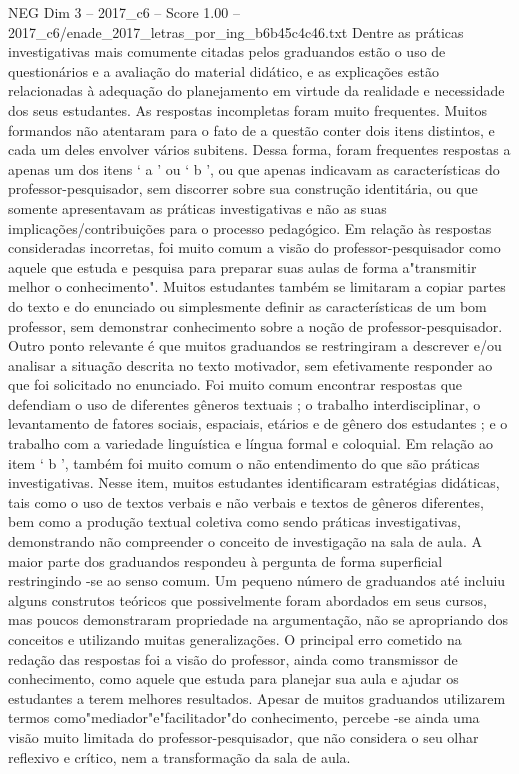 \begin{textsample}{NEG Dim 3 – 2017\_c6 – Score 1.00 – 2017\_c6/enade\_2017\_letras\_por\_ing\_b6b45c4c46.txt}
Dentre as práticas investigativas mais comumente citadas pelos graduandos estão o uso de questionários e a avaliação do material didático, e as explicações estão relacionadas à adequação do planejamento em virtude da realidade e necessidade dos seus estudantes.
As respostas incompletas foram muito frequentes.
Muitos formandos não atentaram para o fato de a questão conter dois itens distintos, e cada um deles envolver vários subitens.
Dessa forma, foram frequentes respostas a apenas um dos itens ‘ a ’ ou ‘ b ’, ou que apenas indicavam as características do professor-pesquisador, sem discorrer sobre sua construção identitária, ou que somente apresentavam as práticas investigativas e não as suas implicações/contribuições para o processo pedagógico.
Em relação às respostas consideradas incorretas, foi muito comum a visão do professor-pesquisador como aquele que estuda e pesquisa para preparar suas aulas de forma a"transmitir melhor o conhecimento".
Muitos estudantes também se limitaram a copiar partes do texto e do enunciado ou simplesmente definir as características de um bom professor, sem demonstrar conhecimento sobre a noção de professor-pesquisador.
Outro ponto relevante é que muitos graduandos se restringiram a descrever e/ou analisar a situação descrita no texto motivador, sem efetivamente responder ao que foi solicitado no enunciado.
Foi muito comum encontrar respostas que defendiam o uso de diferentes gêneros textuais ; o trabalho interdisciplinar, o levantamento de fatores sociais, espaciais, etários e de gênero dos estudantes ; e o trabalho com a variedade linguística e língua formal e coloquial.
Em relação ao item ‘ b ’, também foi muito comum o não entendimento do que são práticas investigativas.
Nesse item, muitos estudantes identificaram estratégias didáticas, tais como o uso de textos verbais e não verbais e textos de gêneros diferentes, bem como a produção textual coletiva como sendo práticas investigativas, demonstrando não compreender o conceito de investigação na sala de aula.
A maior parte dos graduandos respondeu à pergunta de forma superficial restringindo -se ao senso comum.
Um pequeno número de graduandos até incluiu alguns construtos teóricos que possivelmente foram abordados em seus cursos, mas poucos demonstraram propriedade na argumentação, não se apropriando dos conceitos e utilizando muitas generalizações.
O principal erro cometido na redação das respostas foi a visão do professor, ainda como transmissor de conhecimento, como aquele que estuda para planejar sua aula e ajudar os estudantes a terem melhores resultados.
Apesar de muitos graduandos utilizarem termos como"mediador"e"facilitador"do conhecimento, percebe -se ainda uma visão muito limitada do professor-pesquisador, que não considera o seu olhar reflexivo e crítico, nem a transformação da sala de aula.

\end{textsample}
